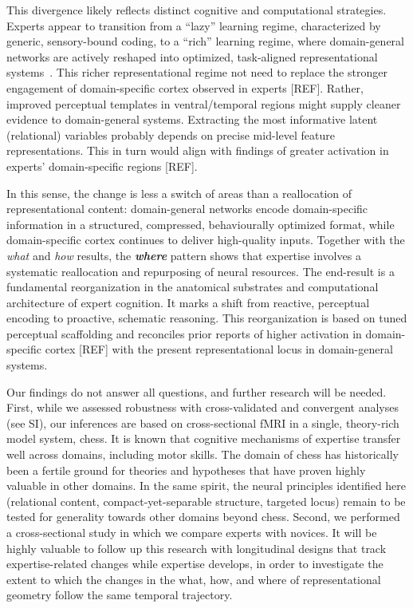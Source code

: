 \documentclass[preprint,12pt]{elsarticle}
\begin{document}
This divergence likely reflects distinct cognitive and computational strategies. Experts appear to transition from a ``lazy'' learning regime, characterized by generic, sensory-bound coding, to a ``rich'' learning regime, where domain-general networks are actively reshaped into optimized, task-aligned representational systems~\cite{flesch_orthogonal_2022}. This richer representational regime not need to replace the stronger engagement of domain-specific cortex observed in experts [REF]. Rather, improved perceptual templates in ventral/temporal regions might supply cleaner evidence to domain-general systems. Extracting the most informative latent (relational) variables probably depends on precise mid-level feature representations. This in turn would align with findings of greater activation in experts’ domain-specific regions [REF].

In this sense, the change is less a switch of areas than a reallocation of representational content: domain-general networks encode domain-specific information in a structured, compressed, behaviourally optimized format, while domain-specific cortex continues to deliver high-quality inputs. Together with the \emph{what} and \emph{how} results, the \textbf{\emph{where}} pattern shows that expertise involves a systematic reallocation and repurposing of neural resources. The end-result is a fundamental reorganization in the anatomical substrates and computational architecture of expert cognition. It marks a shift from reactive, perceptual encoding to proactive, schematic reasoning. This reorganization is based on tuned perceptual scaffolding and reconciles prior reports of higher activation in domain-specific cortex [REF] with the present representational locus in domain-general systems.

Our findings do not answer all questions, and further research will be needed. First,  while we assessed robustness with cross-validated and convergent analyses (see SI), our inferences are based on cross-sectional fMRI in a single, theory-rich model system, chess. It is known that cognitive mechanisms of expertise transfer well across domains, including motor skills. The domain of chess has historically been a fertile ground for theories and hypotheses that have proven highly valuable in other domains. In the same spirit, the neural principles identified here (relational content, compact-yet-separable structure, targeted locus) remain to be tested for generality towards other domains beyond chess. Second, we performed a cross-sectional study in which we compare experts with novices. It will be highly valuable to follow up this research with longitudinal designs that track expertise-related changes while expertise develops, in order to investigate the extent to which the changes in the what, how, and where of representational geometry follow the same temporal trajectory.  
\end{document}
